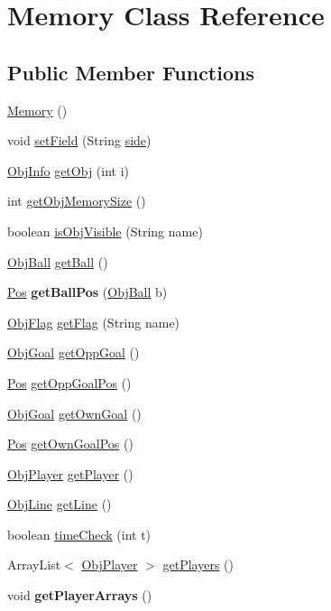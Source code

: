 \hypertarget{classMemory}{
\section{Memory Class Reference}
\label{classMemory}
}
\subsection*{Public Member Functions}
\begin{DoxyCompactItemize}
\item 
\hyperlink{classMemory_a585d7bb6fc6f2237bcebf94a86b7dd99}{Memory} ()
\item 
void \hyperlink{classMemory_a074cc68eab666eb5c8b2b63c8e2065de}{setField} (String \hyperlink{classMemory_ac56cee169ca4e880744065f25f306b82}{side})
\item 
\hyperlink{classObjInfo}{ObjInfo} \hyperlink{classMemory_a608d5c05e19521c10a7cda5d363a8dc1}{getObj} (int i)
\item 
int \hyperlink{classMemory_a43b05e7409d9f1898d5570c38c533489}{getObjMemorySize} ()
\item 
boolean \hyperlink{classMemory_a3229c1214b10c55d92bfea56231c463e}{isObjVisible} (String name)
\item 
\hyperlink{classObjBall}{ObjBall} \hyperlink{classMemory_a22a84014b7be5f41133a2b9dc1239d77}{getBall} ()
\item 
\hypertarget{classMemory_a96efccb45ccabb805f763051d00a3435}{
\hyperlink{classPos}{Pos} {\bfseries getBallPos} (\hyperlink{classObjBall}{ObjBall} b)}
\label{classMemory_a96efccb45ccabb805f763051d00a3435}

\item 
\hyperlink{classObjFlag}{ObjFlag} \hyperlink{classMemory_afb25c0954e27945a3710e6c7aa517061}{getFlag} (String name)
\item 
\hyperlink{classObjGoal}{ObjGoal} \hyperlink{classMemory_a17ae657b29be91c6008d77c23e1626fc}{getOppGoal} ()
\item 
\hyperlink{classPos}{Pos} \hyperlink{classMemory_a0e1a6e8f80b1dd3f53d4825e57344c8b}{getOppGoalPos} ()
\item 
\hyperlink{classObjGoal}{ObjGoal} \hyperlink{classMemory_a2383a8213623bc69db35001830366e9d}{getOwnGoal} ()
\item 
\hyperlink{classPos}{Pos} \hyperlink{classMemory_ac33b04415ba7a2c6b11701042e2f0309}{getOwnGoalPos} ()
\item 
\hyperlink{classObjPlayer}{ObjPlayer} \hyperlink{classMemory_a9962f5f66c44c8c68e29efad2cf06cc8}{getPlayer} ()
\item 
\hyperlink{classObjLine}{ObjLine} \hyperlink{classMemory_a1beaea5588dcb18238b35cef6f22d35c}{getLine} ()
\item 
boolean \hyperlink{classMemory_a228504f0a8e83eb4875549bcc6c69b7d}{timeCheck} (int t)
\item 
ArrayList$<$ \hyperlink{classObjPlayer}{ObjPlayer} $>$ \hyperlink{classMemory_aeb561c441b5219aa0f403296162589cd}{getPlayers} ()
\item 
\hypertarget{classMemory_a91beef231ac2a850e50bfdf8688c5297}{
void {\bfseries getPlayerArrays} ()}
\label{classMemory_a91beef231ac2a850e50bfdf8688c5297}


\end{DoxyCompactItemize}
